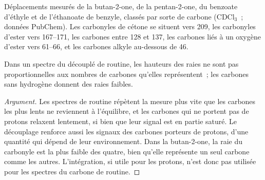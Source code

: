 \begin{omfigure}

{\small Déplacements  mesurés de la butan-2-one, de la pentan-2-one, du benzoate d'éthyle et
de l'éthanoate de benzyle, classés par sorte de carbone (CDCl$_3$~; données PubChem). Les carbonyles de
cétone se situent vers 209, les carbonyles d'ester vers
167--171, les carbones  entre 128 et 137, les carbones liés à un oxygène d'ester vers 61--66,
et les carbones alkyle au-dessous de 46.}
\end{omfigure}

\begin{proposition}\label{prop:b2:structure-determination:intensities}
Dans un spectre du  découplé de routine, les hauteurs des raies ne sont pas proportionnelles
aux nombres de carbones qu'elles représentent~; les carbones sans hydrogène donnent des raies faibles.
\end{proposition}

\begin{proof}[Argument]
Les spectres de routine répètent la mesure plus vite que les carbones les plus lents ne reviennent à
l'équilibre, et les carbones qui ne portent pas de protons relaxent lentement, si bien que leur signal est
en partie saturé. Le découplage renforce aussi les signaux des carbones porteurs de protons, d'une quantité
qui dépend de leur environnement. Dans la butan-2-one, la raie du carbonyle est la plus faible des quatre,
bien qu'elle représente un seul carbone comme les autres. L'intégration, si utile pour les protons, n'est
donc pas utilisée pour les spectres du carbone de routine.
\end{proof}

